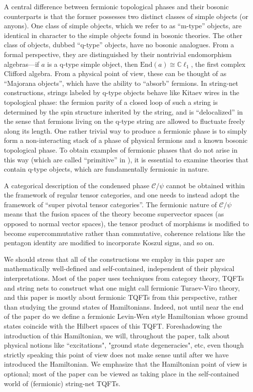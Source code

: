 \documentclass[12pt,a4paper]{article}
\newcommand{\mcc}{\mathcal{C}}
\newcommand{\End}{\text{End}}
\newcommand{\cl}{\mathbb{C}\ell}
\begin{document}
A central difference between fermionic topological phases and their bosonic counterparts is that 
the former possesses two distinct classes of simple objects (or anyons). 
One class of simple objects, which we refer to as ``m-type'' objects, are identical in character
to the simple objects found in bosonic theories. 
The other class of objects, dubbed ``q-type'' objects, have no bosonic analogues. 
From a formal perspective, they are distinguished by their nontrivial endomorphism algebras---if 
$a$ is a q-type simple object, then $\End(a) \cong \cl_1$, the first complex Clifford algebra. 
From a physical point of view, these can be thought of as ``Majorana objects'', which have the ability 
to ``absorb'' fermions. 
In string-net constructions, strings labeled by q-type objects behave like Kitaev wires in the 
topological phase: the fermion parity of a closed loop of such a string is determined by 
the spin structure inherited by the string, and is ``delocalized'' in the sense that fermions living on the q-type string are allowed to fluctuate freely along its length.
One rather trivial way to produce a fermionic phase is to simply form a non-interacting stack of a phase of physical fermions 
and a known bosonic topological phase. 
To obtain examples of fermionic phases that do not arise in this way (which are called ``primitive'' in \cite{Lan2016b}),
it is essential to examine theories that contain q-type objects, which are fundamentally fermionic in nature. 

A categorical description of the condensed phase $\mcc / \psi$ cannot be obtained within the framework 
of regular tensor categories, and one needs to instead adopt the framework of ``super pivotal tensor categories''. 
The fermionic nature of $\mcc / \psi$ means that the fusion spaces of the theory become supervector spaces 
(as opposed to normal vector spaces),
the tensor product of morphisms is modified to become supercommutative rather than commutative, 
coherence relations like the pentagon identity are modified to incorporate Koszul signs, and so on.

We should stress that all of the constructions we employ in this paper are mathematically well-defined and 
self-contained, independent of their physical interpretations. 
Most of the paper uses techniques from category theory, TQFTs and string nets to construct what one
might call fermionic Turaev-Viro theory, and this paper is mostly about fermionic TQFTs from this perspective, 
rather than studying the ground states of Hamiltonians. 
Indeed, not until near the end of the paper do we define a fermionic Levin-Wen style Hamiltonian whose ground states coincide with 
the Hilbert spaces of this TQFT.
Foreshadowing the introduction of this Hamiltonian, we will, throughout the paper, talk about physical notions like ``excitations", "ground state degeneracies", 
etc, even though
strictly speaking this point of view does not make sense until after we have introduced the Hamiltonian.
We emphasize that the Hamiltonian point of view is optional; most of the paper can be viewed as taking place
in the self-contained world of (fermionic) string-net TQFTs.
\end{document}
